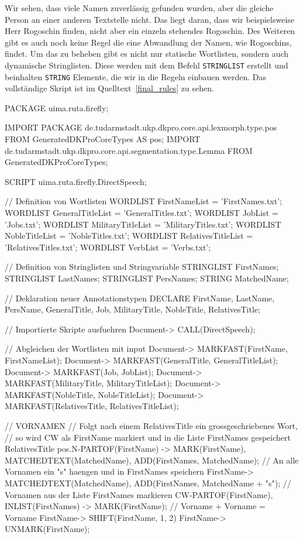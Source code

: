 \documentclass{article}
\begin{document}
Wir sehen, dass viele Namen zuverlässig gefunden wurden, aber die gleiche Person an einer anderen Textstelle nicht. Das liegt daran, dass wir beispielsweise \glqq Herr Rogoschin\grqq{} finden, nicht aber ein einzeln stehendes \glqq Rogoschin\grqq{}. Des Weiteren gibt es auch noch keine Regel die eine Abwandlung der Namen, wie \glqq Rogoschins\grqq{}, findet. Um das zu beheben gibt es nicht nur statische Wortlisten, sondern auch dynamische Stringlisten. Diese werden mit dem Befehl \texttt{STRINGLIST} erstellt und beinhalten \texttt{STRING} Elemente, die wir in die Regeln einbauen werden. Das vollständige Skript ist im Quelltext~\ref{final_rules} zu sehen.

\begin{Ruta}[caption={Das finale Skript Name.ruta.}\label{final_rules}]
PACKAGE uima.ruta.firefly;

IMPORT PACKAGE de.tudarmstadt.ukp.dkpro.core.api.lexmorph.type.pos
FROM GeneratedDKProCoreTypes AS pos;
IMPORT de.tudarmstadt.ukp.dkpro.core.api.segmentation.type.Lemma
FROM GeneratedDKProCoreTypes;

SCRIPT uima.ruta.firefly.DirectSpeech;

// Definition von Wortlisten
WORDLIST FirstNameList = 'FirstNames.txt';
WORDLIST GeneralTitleList = 'GeneralTitles.txt';
WORDLIST JobList = 'Jobs.txt';
WORDLIST MilitaryTitleList = 'MilitaryTitles.txt';
WORDLIST NobleTitleList = 'NobleTitles.txt';
WORDLIST RelativesTitleList = 'RelativesTitles.txt';
WORDLIST VerbList = 'Verbs.txt';

// Definition von Stringlisten und Stringvariable
STRINGLIST FirstNames;
STRINGLIST LastNames;
STRINGLIST PersNames;
STRING MatchedName;

// Deklaration neuer Annotationstypen
DECLARE FirstName, LastName, PersName,
GeneralTitle, Job, MilitaryTitle, NobleTitle, RelativesTitle;

// Importierte Skripte ausfuehren
Document{-> CALL(DirectSpeech)};

// Abgleichen der Wortlisten mit input
Document{-> MARKFAST(FirstName, FirstNameList)};
Document{-> MARKFAST(GeneralTitle, GeneralTitleList)};
Document{-> MARKFAST(Job, JobList)};
Document{-> MARKFAST(MilitaryTitle, MilitaryTitleList)};
Document{-> MARKFAST(NobleTitle, NobleTitleList)};
Document{-> MARKFAST(RelativesTitle, RelativesTitleList)};

// VORNAMEN
// Folgt nach einem RelativesTitle ein grossgeschriebenes Wort,
// so wird CW als FirstName markiert und in die Liste FirstNames gespeichert
RelativesTitle pos.N{-PARTOF(FirstName) ->
MARK(FirstName), MATCHEDTEXT(MatchedName), ADD(FirstNames, MatchedName)};
// An alle Vornamen ein "s" haengen und in FirstNames speichern
FirstName{-> MATCHEDTEXT(MatchedName), ADD(FirstNames, MatchedName + "s")};
// Vornamen aus der Liste FirstNames markieren
CW{-PARTOF(FirstName), INLIST(FirstNames) -> MARK(FirstName)};
// Vorname + Vorname = Vorname
FirstName{-> SHIFT(FirstName, 1, 2)} FirstName{-> UNMARK(FirstName)};


\end{Ruta}
\end{document}
